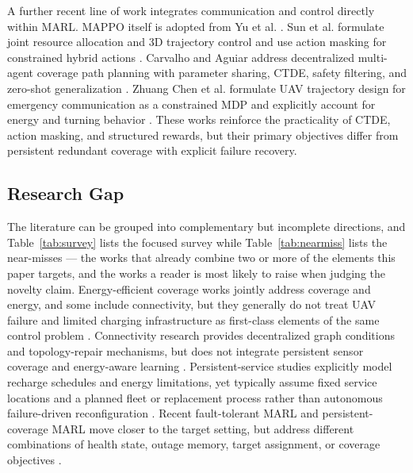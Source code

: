 \documentclass[conference]{IEEEtran}
\begin{document}
A further recent line of work integrates communication and control directly within MARL. MAPPO itself is adopted from Yu et al. \cite{yu2022}. Sun et al. formulate joint resource allocation and 3D trajectory control and use action masking for constrained hybrid actions \cite{sun2025}. Carvalho and Aguiar address decentralized multi-agent coverage path planning with parameter sharing, CTDE, safety filtering, and zero-shot generalization \cite{carvalho2026}. Zhuang Chen et al. formulate UAV trajectory design for emergency communication as a constrained MDP and explicitly account for energy and turning behavior \cite{zhuang2025}. These works reinforce the practicality of CTDE, action masking, and structured rewards, but their primary objectives differ from persistent redundant coverage with explicit failure recovery.

\subsection{Research Gap}
The literature can be grouped into complementary but incomplete directions, and Table~\ref{tab:survey} lists the focused survey while Table~\ref{tab:nearmiss} lists the near-misses --- the works that already combine two or more of the elements this paper targets, and the works a reader is most likely to raise when judging the novelty claim. Energy-efficient coverage works jointly address coverage and energy, and some include connectivity, but they generally do not treat UAV failure and limited charging infrastructure as first-class elements of the same control problem \cite{liu2018,omoniwa2022}. Connectivity research provides decentralized graph conditions and topology-repair mechanisms, but does not integrate persistent sensor coverage and energy-aware learning \cite{zareh2016,basu2004}. Persistent-service studies explicitly model recharge schedules and energy limitations, yet typically assume fixed service locations and a planned fleet or replacement process rather than autonomous failure-driven reconfiguration \cite{mathew2015,arribas2023}. Recent fault-tolerant MARL and persistent-coverage MARL move closer to the target setting, but address different combinations of health state, outage memory, target assignment, or coverage objectives \cite{jiang2024,mei2026}.
\end{document}
